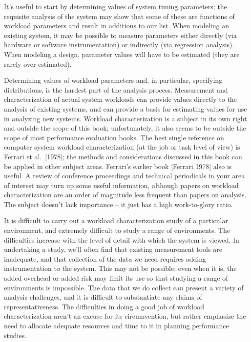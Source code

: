 It's useful to start by determining values of system timing parameters; the
requisite analysis of the system may show that some of these are functions of
workload parameters and result in additions to our list. When modeling an
existing system, it may be possible to measure parameters either directly
(via hardware or software instrumentation) or indirectly (via regression
analysis). When modeling a design, parameter values will have to be estimated
(they are rarely over-estimated).

Determining values of workload parameters and, in particular, specifying
distributions, is the hardest part of the analysis process. Measurement and
characterization of actual system workloads can provide values directly to the
analysis of existing systems, and can provide a basis for estimating values for
use in analyzing new systems. Workload characterization is a subject in its
own right and outside the scope of this book; unfortunately, it also seems to
be outside the scope of most performance evaluation books. The best single
reference on computer system workload characterization (at the job or task
level of view) is Ferrari et al.\ [1978]; the methods and considerations
 discussed in this book can be applied in other subject areas. Ferrari's
earlier book [Ferrari 1978] also is useful. A review of conference proceedings
and technical periodicals in your area of interest may turn up some useful
information, although papers on workload characterization are an order of
magnitude less frequent than papers on analysis. The subject doesn't lack
importance -- it just has a high work-to-glory ratio.

It is difficult to carry out a workload characterization study of a particular
environment, and extremely difficult to study a range of environments. The
difficulties increase with the level of detail with which the system is
viewed. In undertaking a study, we'll often find that existing measurement
tools are inadequate, and that collection of the data we need requires adding
instrumentation to the system. This may not be possible; even when it is, the
added overhead or added risk may limit its use so that studying a range of
environments is impossible. The data that we do collect can present a variety
of analysis challenges, and it is difficult to substantiate any claims of
representativeness. The difficulties in doing a good job of workload
characterization aren't an excuse for its circumvention, but rather emphasize
the need to allocate adequate resources and time to it in planning performance
studies.

